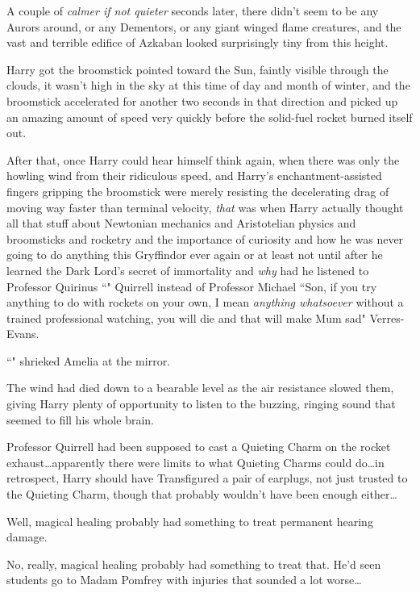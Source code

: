 A couple of \emph{calmer if not quieter} seconds later, there didn't seem to be any Aurors around, or any Dementors, or any giant winged flame creatures, and the vast and terrible edifice of Azkaban looked surprisingly tiny from this height.

Harry got the broomstick pointed toward the Sun, faintly visible through the clouds, it wasn't high in the sky at this time of day and month of winter, and the broomstick accelerated for another two seconds in that direction and picked up an amazing amount of speed very quickly before the solid-fuel rocket burned itself out.

After that, once Harry could hear himself think again, when there was only the howling wind from their ridiculous speed, and Harry's enchantment-assisted fingers gripping the broomstick were merely resisting the decelerating drag of moving way faster than terminal velocity, \emph{that} was when Harry actually thought all that stuff about Newtonian mechanics and Aristotelian physics and broomsticks and rocketry and the importance of curiosity and how he was never going to do anything this Gryffindor ever again or at least not until after he learned the Dark Lord's secret of immortality and \emph{why} had he listened to Professor Quirinus ``" Quirrell instead of Professor Michael ``Son, if you try anything to do with rockets on your own, I mean \emph{anything whatsoever} without a trained professional watching, you will die and that will make Mum sad" Verres-Evans.

\later

``" shrieked Amelia at the mirror.

\later

The wind had died down to a bearable level as the air resistance slowed them, giving Harry plenty of opportunity to listen to the buzzing, ringing sound that seemed to fill his whole brain.

Professor Quirrell had been supposed to cast a Quieting Charm on the rocket exhaust…apparently there were limits to what Quieting Charms could do…in retrospect, Harry should have Transfigured a pair of earplugs, not just trusted to the Quieting Charm, though that probably wouldn't have been enough either…

Well, magical healing probably had something to treat permanent hearing damage.

No, really, magical healing probably had something to treat that. He'd seen students go to Madam Pomfrey with injuries that sounded a lot worse…

